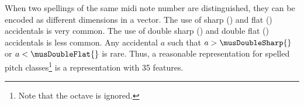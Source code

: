 
When two spellings of the same \gls{midi} note number are
distinguished, they can be encoded as different dimensions
in a vector. The use of sharp (\musSharp{}) and flat
(\musFlat{}) accidentals is very common. The use of double
sharp (\musDoubleSharp{}) and double flat (\musDoubleFlat{})
accidentals is less common. Any accidental $a$ such that $a
> \musDoubleSharp{}$ or $a < \musDoubleFlat{}$ is rare.
Thus, a reasonable representation for spelled pitch
classes\footnote{Note that the octave is ignored.} is a
representation with 35 features.
